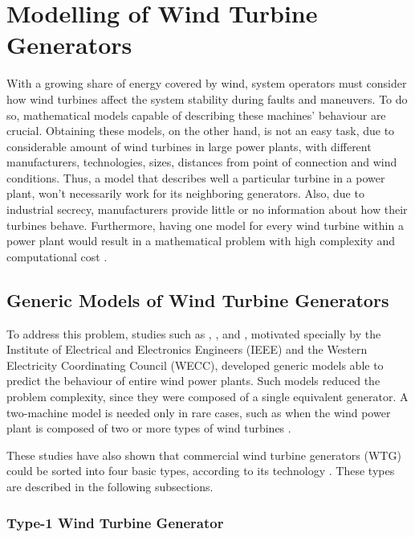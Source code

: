 \chapter{Modelling of Wind Turbine Generators}

\label{ch: Mod}

With a growing share of energy covered by wind, system operators must consider how wind turbines affect the system stability during faults and maneuvers. To do so, mathematical models capable of describing these machines' behaviour are crucial. Obtaining these models, on the other hand, is not an easy task, due to considerable amount of wind turbines in large power plants, with different manufacturers, technologies, sizes, distances from point of connection and wind conditions. Thus, a model that describes well a particular turbine in a power plant, won't necessarily work for its neighboring generators. Also, due to industrial secrecy, manufacturers provide little or no information about how their turbines behave. Furthermore, having one model for every wind turbine within a power plant would result in a mathematical problem with high complexity and computational cost \cite{Erlich2012}.

\section{Generic Models of Wind Turbine Generators}

To address this problem, studies such as \cite{Muljadi2008}, \cite{Ellis2011}, \cite{council2008wecc} and \cite{Asmine2011}, motivated specially by the Institute of Electrical and Electronics Engineers (IEEE) and the Western Electricity Coordinating Council (WECC), developed generic models able to predict the behaviour of entire wind power plants. Such models reduced the problem complexity, since they were composed of a single equivalent generator. A two-machine model is needed only in rare cases, such as when the wind power plant is composed of two or more types of wind turbines \cite{Ellis2011}.

These studies have also shown that commercial wind turbine generators (WTG) could be sorted into four basic types, according to its technology \cite{Ellis2011}. These types are described in the following subsections.

\subsection{Type-1 Wind Turbine Generator}

